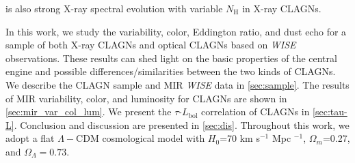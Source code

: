 \documentclass[linenumbers]{aastex631}
\begin{document}
is also strong X-ray spectral evolution with variable $N_\mathrm{H}$ \citep[e.g., NGC 1365;][]{2021RAA....21..199L} in X-ray CLAGNs. 








In this work, we study the variability, color, Eddington ratio, and dust echo for a sample of both X-ray CLAGNs and optical CLAGNs based on {\it WISE} observations. These results can shed light on the basic properties of the central engine and possible differences/similarities between the two kinds of CLAGNs. We describe the CLAGN sample and MIR {\it WISE} data in \autoref{sec:sample}. The results of MIR variability, color, and luminosity for CLAGNs are shown in \autoref{sec:mir_var_col_lum}. We present the $\tau$-$L_\mathrm{bol}$ correlation of CLAGNs in \autoref{sec:tau-L}. Conclusion and discussion are presented in \autoref{sec:dis}. Throughout this work, we adopt a flat $\Lambda-$CDM cosmological model with $H_0$=70 km s$^{-1}$ Mpc $^{-1}$, $\Omega_{m}$=0.27, and $\Omega_{\Lambda}=0.73 $.
\end{document}
